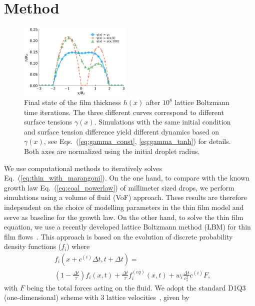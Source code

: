 \documentclass[twocolumn,amsmath,amssymb,showpacs,pre,nofootinbib,superscriptaddress]{revtex4-1} %
\begin{document}
\section{Method}\label{sec:method}
\begin{figure}
    \centering
    \includegraphics[width=0.48\textwidth]{Figures/three_cases.pdf}
    \caption{Final state of the film thickness $h(x)$ after $10^8$ lattice Boltzmann time iterations.
    The three different curves correspond to different surface tensions $\gamma(x)$.
    Simulations with the same initial condition and surface tension difference yield different dynamics based on $\gamma(x)$, see Eqs.~(\ref{eq:gamma_const}, \ref{eq:gamma_tanh}) for details.
    Both axes are normalized using the initial droplet radius.}
    \label{fig:final_state}
\end{figure}
We use computational methods to iteratively solves Eq.~(\ref{eq:thin_with_marangoni}).
On the one hand, to compare with the known growth law Eq.~(\ref{eq:coal_powerlaw}) of millimeter sized drops, we perform simulations using a volume of fluid (VoF) approach.
These results are therefore independent on the choice of modelling parameters in the thin film model and serve as baseline for the growth law. 
On the other hand, to solve the thin film equation, we use a recently developed lattice Boltzmann method (LBM) for thin film flows~\cite{PhysRevE.100.033313, PhysRevE.104.034801}.
This approach is based on the evolution of discrete probability density functions ($f_i$) where
\begin{equation}\label{eq:LBE}
    \begin{split}
        &f_i(x+c^{(i)}\Delta t,t+\Delta t) = \\
        &\left(1 - \frac{\Delta t}{\tau}\right) f_i(x,t) + \frac{\Delta t}{\tau} f_i^{(eq)}(x,t) + w_i \frac{\Delta t}{c_s^2} c^{(i)} F,
    \end{split}
\end{equation}
with $F$ being the total forces acting on the fluid.
We adopt the standard D1Q3 (one-dimensional) scheme with $3$ lattice velocities~\cite{krueger2017}, given by
\end{document}
